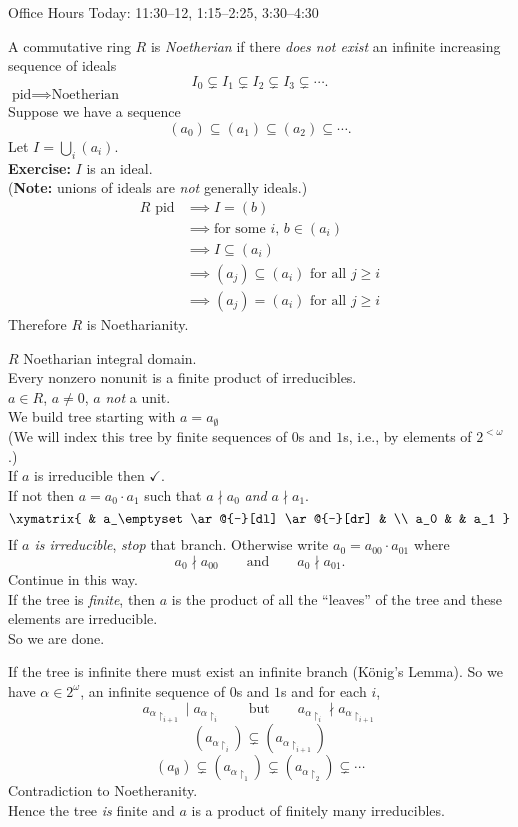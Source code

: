 Office Hours Today: 11:30--12, 1:15--2:25, 3:30--4:30

 A commutative ring $R$ is \emph{Noetherian} if there \emph{does not exist} an infinite increasing sequence of ideals
\[ I_0 \subsetneq I_1 \subsetneq I_2 \subsetneq I_3 \subsetneq \dotsb . \]
\lem $\text{pid}\implies\text{Noetherian}$ \\
\pf Suppose we have a sequence
\[ (a_0) \subseteq (a_1) \subseteq (a_2) \subseteq \dotsb . \]
Let $I=\bigcup_i(a_i)$. \\
\textbf{Exercise: }$I$ is an ideal. \\
(\textbf{Note: }unions of ideals are \emph{not} generally ideals.)
\begin{align*}
\text{$R$ pid} &\implies I=(b) \\
&\implies \text{for some $i$, $b\in(a_i)$} \\
&\implies I \subseteq (a_i) \\
&\implies (a_j) \subseteq (a_i) \text{ for all $j\geq i$} \\
&\implies (a_j) = (a_i) \text{ for all $j\geq i$}
\end{align*}
Therefore $R$ is Noetharianity.

\prop $R$ Noetharian integral domain. \\
Every nonzero nonunit is a finite product of irreducibles. \\
\pf $a\in R$, $a\neq0$, $a$ \emph{not} a unit. \\
We build tree starting with $a=a_\emptyset$ \\
(We will index this tree by finite sequences of $0$s and $1$s, i.e., by elements of $2^{<\omega}$.) \\
If $a$ is irreducible then $\checkmark$. \\
If not then $a=a_0\cdot a_1$ such that $a\nmid a_0$ \emph{and} $a\nmid a_1$.%
\[ \xymatrix{
& a_\emptyset \ar@{-}[dl] \ar@{-}[dr] & \\
a_0 & & a_1
} \]
If \emph{$a$ is irreducible}, \emph{stop} that branch.  Otherwise write $a_0=a_{00}\cdot a_{01}$ where
\[ a_0\nmid a_{00} \qquad\text{and}\qquad a_0\nmid a_{01} . \]
Continue in this way. \\
If the tree is \emph{finite}, then $a$ is the product of all the ``leaves'' of the tree and these elements are irreducible. \\
So we are done.

If the tree is infinite there must exist an infinite branch (K\"onig's Lemma).  So we have $\alpha\in2^\omega$, an infinite sequence of $0$s and $1$s and for each $i$,
\[ a_{\alpha\upharpoonright_{i+1}} \mid a_{\alpha\upharpoonright_i} \qquad\text{but}\qquad a_{\alpha\upharpoonright_i}\nmid a_{\alpha\upharpoonright_{i+1}} \]
\[ (a_{\alpha\upharpoonright_i}) \subsetneq (a_{\alpha\upharpoonright_{i+1}}) \]
\[ (a_\emptyset) \subsetneq (a_{\alpha\upharpoonright_1}) \subsetneq (a_{\alpha\upharpoonright_2}) \subsetneq \dotsb \]
Contradiction to Noetheranity. \\
Hence the tree \emph{is} finite and $a$ is a product of finitely many irreducibles.

